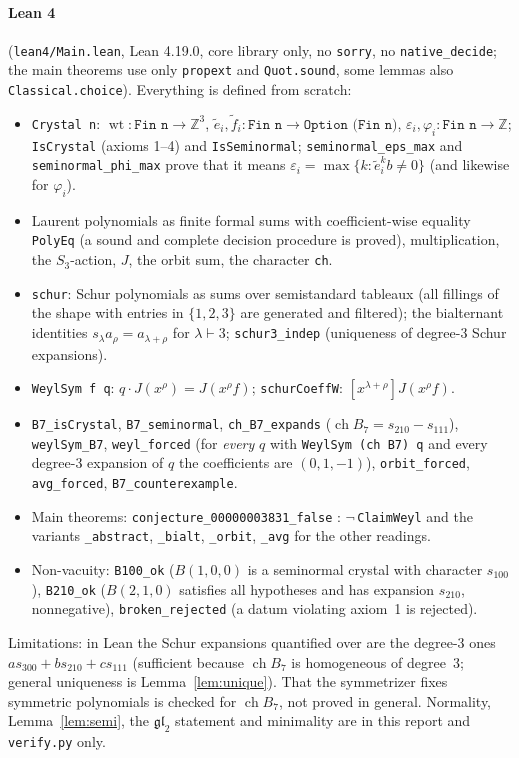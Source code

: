 \documentclass[11pt]{article}
\theoremstyle{definition}
\theoremstyle{remark}
\newcommand{\wt}{\operatorname{wt}}
\newcommand{\ch}{\operatorname{ch}}
\newcommand{\Z}{\mathbb Z}
\begin{document}
\paragraph{Lean 4} (\texttt{lean4/Main.lean}, Lean 4.19.0, core library only, no \texttt{sorry},
no \texttt{native\_decide}; the main theorems use only \texttt{propext} and \texttt{Quot.sound},
some lemmas also \texttt{Classical.choice}). Everything is defined from scratch:
\begin{itemize}
\item \texttt{Crystal n}: $\wt\colon\texttt{Fin n}\to\Z^3$, $\tilde e_i,\tilde f_i\colon
\texttt{Fin n}\to\texttt{Option (Fin n)}$, $\varepsilon_i,\varphi_i\colon\texttt{Fin n}\to\Z$;
\texttt{IsCrystal} (axioms 1--4) and \texttt{IsSeminormal}; \texttt{seminormal\_eps\_max} and
\texttt{seminormal\_phi\_max} prove that it means $\varepsilon_i=\max\{k:\tilde e_i^kb\neq0\}$
(and likewise for $\varphi_i$).
\item Laurent polynomials as finite formal sums with coefficient-wise equality \texttt{PolyEq}
(a sound and complete decision procedure is proved), multiplication, the $S_3$-action, $J$, the
orbit sum, the character \texttt{ch}.
\item \texttt{schur}: Schur polynomials as sums over semistandard tableaux (all fillings of the
shape with entries in $\{1,2,3\}$ are generated and filtered); the bialternant identities
$s_\lambda a_\rho=a_{\lambda+\rho}$ for $\lambda\vdash3$; \texttt{schur3\_indep} (uniqueness of
degree-$3$ Schur expansions).
\item \texttt{WeylSym f q}: $q\cdot J(x^\rho)=J(x^\rho f)$; \texttt{schurCoeffW}:
$[x^{\lambda+\rho}]J(x^\rho f)$.
\item \texttt{B7\_isCrystal}, \texttt{B7\_seminormal}, \texttt{ch\_B7\_expands}
($\ch B_7=s_{210}-s_{111}$), \texttt{weylSym\_B7}, \texttt{weyl\_forced} (for \emph{every} $q$
with \texttt{WeylSym (ch B7) q} and every degree-3 expansion of $q$ the coefficients are
$(0,1,-1)$), \texttt{orbit\_forced}, \texttt{avg\_forced}, \texttt{B7\_counterexample}.
\item Main theorems: \texttt{conjecture\_00000003831\_false} : $\neg$\,\texttt{ClaimWeyl} and the variants
\texttt{\_abstract}, \texttt{\_bialt}, \texttt{\_orbit}, \texttt{\_avg} for the other readings.
\item Non-vacuity: \texttt{B100\_ok} ($B(1,0,0)$ is a seminormal crystal with character
$s_{100}$), \texttt{B210\_ok} ($B(2,1,0)$ satisfies all hypotheses and has expansion $s_{210}$,
nonnegative), \texttt{broken\_rejected} (a datum violating axiom~1 is rejected).
\end{itemize}
Limitations: in Lean the Schur expansions quantified over are the degree-$3$ ones
$a s_{300}+b s_{210}+c s_{111}$ (sufficient because $\ch B_7$ is homogeneous of degree~3; general
uniqueness is Lemma~\ref{lem:unique}). That the symmetrizer fixes symmetric polynomials is checked
for $\ch B_7$, not proved in general. Normality, Lemma~\ref{lem:semi}, the $\mathfrak{gl}_2$
statement and minimality are in this report and \texttt{verify.py} only.
\end{document}
